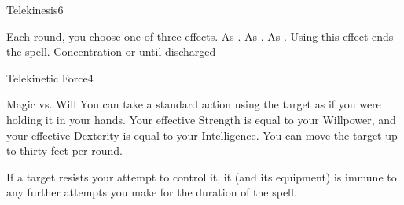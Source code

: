 \begin{spellfooter}
\begin{spellsection}{Telekinesis}{6}
    \begin{spellheader}
    \end{spellheader}
    \begin{spellcontent}
        \begin{spelltargetinginfo}
            \spellrng{\rngmed}
        \end{spelltargetinginfo}
        \begin{spelleffects}
            \spellspecial Each round, you choose one of three effects.
             As .
             As .
             As . Using this effect ends the spell.
            \spelldur Concentration or until discharged
        \end{spelleffects}
    \end{spellcontent}
    \begin{spellfooter}
    \end{spellfooter}
\end{spellsection}

\begin{spellsection}{Telekinetic Force}{4}
    \begin{spellheader}
    \end{spellheader}
    \begin{spellcontent}
        \begin{spelltargetinginfo}
        \end{spelltargetinginfo}
        \begin{spelleffects}
            \begin{spellattack}{Magic vs. Will}
                \spellsuccess You can take a standard action using the target as if you were holding it in your hands. Your effective Strength is equal to your Willpower, and your effective Dexterity is equal to your Intelligence. You can move the target up to thirty feet per round.
            \end{spellattack}
        \end{spelleffects}
    \end{spellcontent}
    \begin{spellfooter}
        \spellnotes If a target resists your attempt to control it, it (and its equipment) is immune to any further attempts you make for the duration of the spell.
    \end{spellfooter}
\end{spellsection}


\end{spellfooter}
